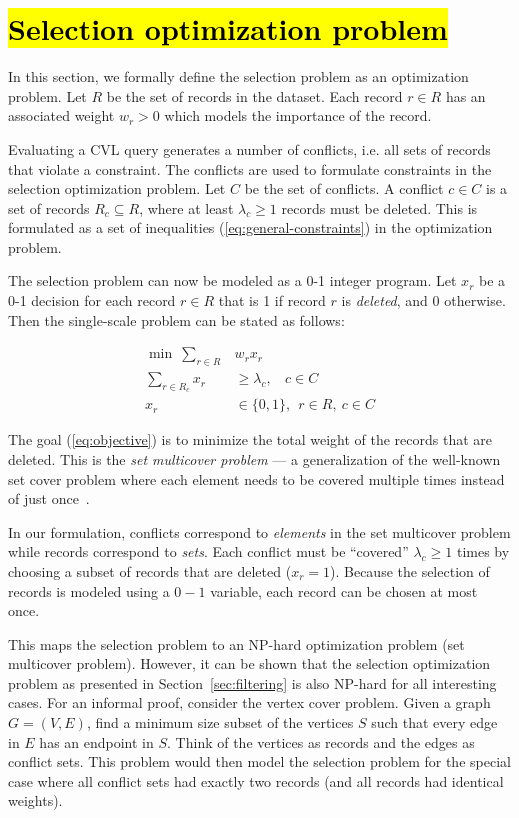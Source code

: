 \section{\hl{Selection optimization problem}}
\label{sec:optimizationmodel}

In this section, we formally define the selection problem as an optimization problem. Let $R$ be the set of records in the dataset. Each record $r \in R$ has an associated weight $w_r > 0$ which models the importance of the record. 

Evaluating a CVL query generates a number of conflicts, i.e. all sets of records that violate a constraint. The conflicts are used to formulate constraints in the selection optimization problem. Let $C$ be the set of conflicts. A conflict $c \in C$ is a set of records $R_c \subseteq R$, where at least $\lambda_c \geq 1$ records must be deleted. This is formulated as a set of inequalities (\ref{eq:general-constraints}) in the optimization problem.

The selection problem can now be modeled as a 0-1 integer program. Let $x_r$ be a 0-1 decision for each record $r \in R$ that is 1 if record $r$ is \emph{deleted}, and 0 otherwise. Then the single-scale problem can be stated as follows:

\begin{align}
  \label{eq:objective}
  \min ~\sum_{r \in R} &w_r x_r \\
  \label{eq:general-constraints}
  \sum_{r \in R_c} x_r &\geq \lambda_c, ~~~~ c \in C \\
  x_r & \in \{0, 1\}, ~~ r \in R, ~c \in C
\end{align}

The goal (\ref{eq:objective}) is to minimize the total weight of the records that are deleted. This is the \emph{set multicover problem} --- a generalization of the well-known set cover problem where each element needs to be covered multiple times instead of just once~\cite{rajagopalan1998primal}. 

In our formulation, conflicts correspond to \textit{elements} in the set multicover problem while records correspond to \textit{sets}. Each conflict must be ``covered'' $\lambda_c \geq 1$ times by choosing a subset of records that are deleted ($x_r=1$). Because the selection of records is modeled using a $0-1$ variable, each record can be chosen at most once.

This maps the selection problem to an NP-hard optimization problem (set multicover problem). However, it can be shown that the selection optimization problem as presented in Section~\ref{sec:filtering} is also NP-hard for all interesting cases. For an informal proof, consider the vertex cover problem. Given a graph $G=(V,E)$, find a minimum size subset of the vertices $S$ such that every edge in $E$ has an endpoint in $S$. Think of the vertices as records and the edges as conflict sets. This problem would then model the selection problem for the special case where all conflict sets had exactly two records (and all records had identical weights).

